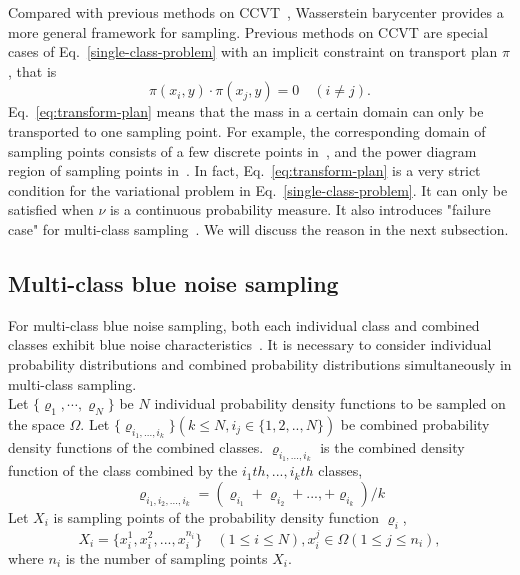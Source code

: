 Compared with previous methods on CCVT~\cite{balzer:2009:capacity,de:2012:blue},
Wasserstein barycenter provides a more general framework for sampling.
Previous methods on CCVT are special cases of Eq.~\ref{single-class-problem} with an implicit constraint on  transport plan $\pi$,
that is
\begin{equation}\label{eq:transform-plan}
  \pi(x_i,y)\cdot\pi(x_j,y)=0 \quad(i\neq j).
\end{equation}
Eq.~\ref{eq:transform-plan} means that the mass in a certain domain can only be transported to one sampling point.
For example,
the corresponding domain of sampling points consists of a few discrete points in~\cite{balzer:2009:capacity},
and the power diagram region of sampling points in~\cite{de:2012:blue}.
In fact,
Eq.~\ref{eq:transform-plan} is a very strict condition for the variational problem in Eq.~\ref{single-class-problem}.
It can only be satisfied when $\nu$ is a continuous probability measure.
It also introduces "failure case" for multi-class sampling~\cite{wei:2010:multi}.
We will discuss the reason in the next subsection.

\subsection{Multi-class blue noise sampling}
For multi-class blue noise sampling,
both each individual class and combined classes exhibit blue noise characteristics~\cite{wei:2010:multi}.
It is necessary to consider individual probability distributions and combined probability distributions simultaneously
in multi-class sampling. \\
Let $\{\varrho_1,\cdots,\varrho_N\}$ be $N$ individual probability density functions
to be sampled on the space $\Omega$.
Let $\{\varrho_{{i}_1,...,i_k}\}(k\leq N,i_j\in\{1,2,..,N\})$
be combined probability density functions of the combined classes.
$\varrho_{{i}_1,...,i_k}$ is the combined density function of the class combined by  the $i_1th,...,i_kth$ classes,
\begin{equation*}
    \varrho_{i_1,i_2,...,i_k}=(\varrho_{i_1}+\varrho_{i_2}+...,+\varrho_{i_k})/k
\end{equation*}
Let $X_i$ is sampling points of the probability density function $\varrho_i$,
\begin{equation*}
  X_i=\{x_i^1,x_i^2,...,x_i^{n_i}\}\quad(1\leq i\leq N), x_i^j\in\Omega(1\leq j\leq n_i),
\end{equation*}
where $n_i$ is the number of sampling points $X_i$.

